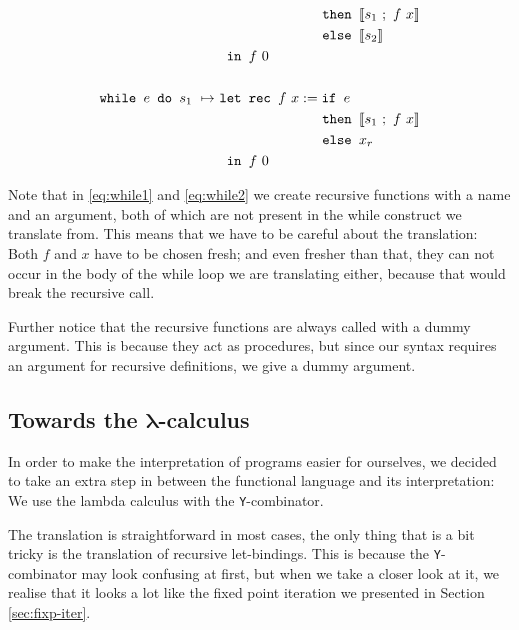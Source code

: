 \documentclass[11pt, leqno, titlepage]{article}
\theoremstyle{definition}
\begin{document}
\begin{align}
                    & \phantom{{}=11111111111} \texttt{ then } \llbracket s_1 ~;~ f~x \rrbracket \notag\\
                    &\phantom{{}=11111111111}\texttt{ else } \llbracket s_2 \rrbracket\notag\\
                    & \texttt{ in } f~0 \notag \\
  \notag\\
  \texttt{while } e \texttt{ do } s_1
                    ~\mapsto~ & \texttt{let rec } f~x :=
                                 \texttt{if } e \label{eq:while2}\\
                    & \phantom{{}=11111111111}\texttt{ then } \llbracket s_1 ~;~ f~x \rrbracket\notag\\
                    & \phantom{{}=11111111111}\texttt{ else } x_r \notag\\
                    & \texttt{ in } f~0\notag
\end{align}

Note that in \ref{eq:while1} and \ref{eq:while2} we create recursive functions with a
name and an argument, both of which are not present in the while construct we
translate from. This means that we have to be careful about the translation: Both $f$
and $x$ have to be chosen fresh; and even fresher than that, they can not occur in
the body of the while loop we are translating either, because that would break the
recursive call.

Further notice that the recursive functions are always called with a dummy
argument. This is because they act as procedures, but since our syntax requires an
argument for recursive definitions, we give a dummy argument.


\subsection{Towards the $\mathbf{\lambda}$-calculus}\label{sec:fun-to-lambda}  

In order to make the interpretation of programs easier for ourselves, we decided to
take an extra step in between the functional language and its interpretation: We use
the lambda calculus with the \texttt{Y}-combinator.

The translation is straightforward in most cases, the only thing that is a bit tricky
is the translation of recursive let-bindings. This is because the
\texttt{Y}-combinator may look confusing at first, but when we take a closer look at
it, we realise that it looks a lot like the fixed point iteration we presented in
Section \ref{sec:fixp-iter}.
\end{document}
